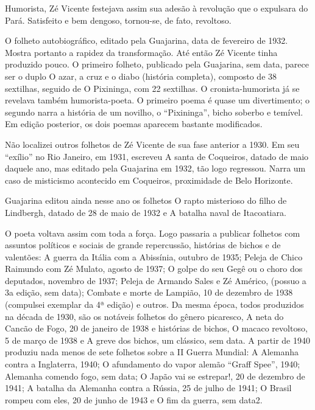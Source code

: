 Humorista, Zé Vicente festejava assim sua adesão à revolução que o
expulsara do Pará. Satisfeito e bem dengoso, tornou-se, de fato,
revoltoso.

O folheto autobiográfico, editado pela Guajarina, data de fevereiro de
1932. Mostra portanto a rapidez da transformação. Até então Zé
Vicente tinha produzido pouco. O primeiro folheto, publicado pela
Guajarina, sem data, parece ser o duplo O azar, a cruz e o diabo
(história completa), composto de 38 sextilhas, seguido de O
Pixininga, com 22 sextilhas. O cronista-humorista já se revelava
também humorista-poeta. O primeiro poema é quase um divertimento; o
segundo narra a história de um novilho, o “Pixininga”, bicho soberbo
e temível. Em edição posterior, os dois poemas aparecem bastante
modificados.

Não localizei outros folhetos de Zé Vicente de sua fase anterior a
1930. Em seu “exílio” no Rio Janeiro, em 1931, escreveu A santa de
Coqueiros, datado de maio daquele ano, mas editado pela Guajarina em
1932, tão logo regressou. Narra um caso de misticismo acontecido em
Coqueiros, proximidade de Belo Horizonte. 

Guajarina editou ainda nesse ano os folhetos O rapto misterioso do
filho de Lindbergh, datado de 28 de maio de 1932 e A batalha naval de
Itacoatiara.

O poeta voltava assim com toda a força. Logo passaria a publicar
folhetos com assuntos políticos e sociais de grande repercussão,
histórias de bichos e de valentões: A guerra da Itália com a
Abissínia, outubro de 1935; Peleja de Chico Raimundo com Zé Mulato,
agosto de 1937; O golpe do seu Gegê ou o choro dos deputados,
novembro de 1937; Peleja de Armando Sales e Zé Américo, (possuo a 3a
edição, sem data); Combate e morte de Lampião, 10 de dezembro de 1938
(compulsei exemplar da 4ª edição) e outros. Da mesma época, todos
produzidos na década de 1930, são os notáveis folhetos do gênero
picaresco, A neta do Cancão de Fogo, 20 de janeiro de 1938 e
histórias de bichos, O macaco revoltoso, 5 de março de 1938 e A greve
dos bichos, um clássico, sem data. A partir de 1940 produziu nada
menos de sete folhetos sobre a II Guerra Mundial: A Alemanha contra a
Inglaterra, 1940; O afundamento do vapor alemão “Graff Spee”, 1940;
Alemanha comendo fogo, sem data; O Japão vai se estrepar!, 20 de
dezembro de 1941; A batalha da Alemanha contra a Rússia, 25 de julho
de 1941; O Brasil rompeu com eles, 20 de junho de 1943 e O fim da
guerra, sem data2.

